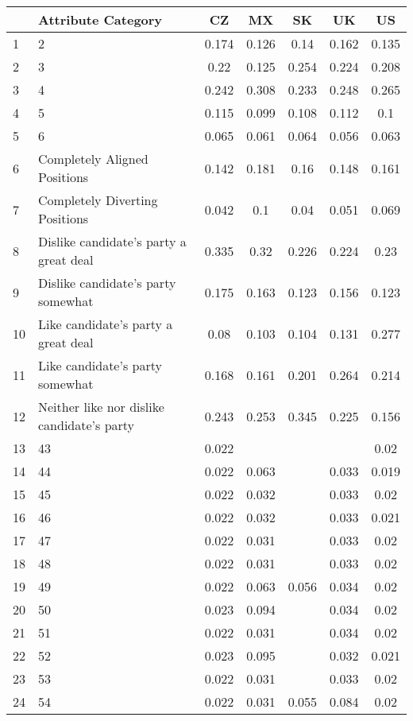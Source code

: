\begin{longtable}{lp{7cm}ccccc}
  \toprule
 & Attribute Category & CZ & MX & SK & UK & US \\ 
  \midrule
1 & 2 & 0.174 & 0.126 & 0.14 & 0.162 & 0.135 \\ 
  2 & 3 & 0.22 & 0.125 & 0.254 & 0.224 & 0.208 \\ 
  3 & 4 & 0.242 & 0.308 & 0.233 & 0.248 & 0.265 \\ 
  4 & 5 & 0.115 & 0.099 & 0.108 & 0.112 & 0.1 \\ 
  5 & 6 & 0.065 & 0.061 & 0.064 & 0.056 & 0.063 \\ 
  6 & Completely Aligned Positions & 0.142 & 0.181 & 0.16 & 0.148 & 0.161 \\ 
  7 & Completely Diverting Positions & 0.042 & 0.1 & 0.04 & 0.051 & 0.069 \\ 
  8 & Dislike candidate's party a great deal & 0.335 & 0.32 & 0.226 & 0.224 & 0.23 \\ 
  9 & Dislike candidate's party somewhat & 0.175 & 0.163 & 0.123 & 0.156 & 0.123 \\ 
  10 & Like candidate's party a great deal & 0.08 & 0.103 & 0.104 & 0.131 & 0.277 \\ 
  11 & Like candidate's party somewhat & 0.168 & 0.161 & 0.201 & 0.264 & 0.214 \\ 
  12 & Neither like nor dislike candidate's party & 0.243 & 0.253 & 0.345 & 0.225 & 0.156 \\ 
  13 & 43 & 0.022 &  &  &  & 0.02 \\ 
  14 & 44 & 0.022 & 0.063 &  & 0.033 & 0.019 \\ 
  15 & 45 & 0.022 & 0.032 &  & 0.033 & 0.02 \\ 
  16 & 46 & 0.022 & 0.032 &  & 0.033 & 0.021 \\ 
  17 & 47 & 0.022 & 0.031 &  & 0.033 & 0.02 \\ 
  18 & 48 & 0.022 & 0.031 &  & 0.033 & 0.02 \\ 
  19 & 49 & 0.022 & 0.063 & 0.056 & 0.034 & 0.02 \\ 
  20 & 50 & 0.023 & 0.094 &  & 0.034 & 0.02 \\ 
  21 & 51 & 0.022 & 0.031 &  & 0.034 & 0.02 \\ 
  22 & 52 & 0.023 & 0.095 &  & 0.032 & 0.021 \\ 
  23 & 53 & 0.022 & 0.031 &  & 0.033 & 0.02 \\ 
  24 & 54 & 0.022 & 0.031 & 0.055 & 0.084 & 0.02 \\ 

\end{longtable}

